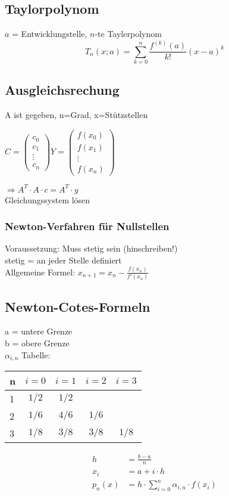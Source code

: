 \documentclass[a4paper, 8pt, landscape]{extarticle}
\let\oldsum\sum
\renewcommand{\sum}{\ensuremath{\textstyle\oldsum}}
\begin{document}
\begin{multicols*}{5}
			\subsection{Taylorpolynom}
				$a$ = Entwicklungstelle, $n$-te Taylerpolynom\\
				$$ T_n(x;a) = \sum_{k=0}^{n}\frac{f^{(k)}(a)}{k!}(x-a)^k$$
			
			\subsection{Ausgleichsrechung}
				A ist gegeben, n=Grad, x=Stützstellen
				\begin{multicols}{2}
					$C=\begin{pmatrix}
						c_0\\
						c_1\\
						\vdots\\
						c_n
					\end{pmatrix}
					Y=\begin{pmatrix}
						f(x_0)\\
						f(x_1)\\
						\vdots\\
						f(x_n)
					\end{pmatrix}$
				\end{multicols}
					$\Rightarrow A^T\cdot A\cdot c=A^T\cdot y$\\
					Gleichungssystem lösen


			\subsubsection{Newton-Verfahren für Nullstellen}
				Voraussetzung: Muss stetig sein (hinschreiben!)\\
				stetig = an jeder Stelle definiert\\
				Allgemeine Formel: $x_{n+1}=x_{n}-\frac{f(x_{n})}{f'(x_{n})}$
	    \subsection{Newton-Cotes-Formeln}
   			a = untere Grenze\\
			b = obere Grenze\\
			$\alpha_{i,n}$ Tabelle:\\
			\begin{tabular}{l | c c c c }
				n & $i=0$ & $i=1$ & $i=2$ & $i=3$ \\\hline
				1 & $1/2$ & $1/2$ & & \\
				2 & $1/6$ & $4/6$ & $1/6$ & \\
				3 & $1/8$ & $3/8$ & $3/8$ & $1/8$
			\end{tabular}
			\begin{align*}
		        h &= \frac{b-a}{n}\\
		        x_i &= a+i\cdot h\\
		        p_{n}(x) &= h\cdot \sum_{i=0}^{n}\alpha_{i,n}\cdot f(x_{i})
			\end{align*}

\end{multicols*}
\end{document}
